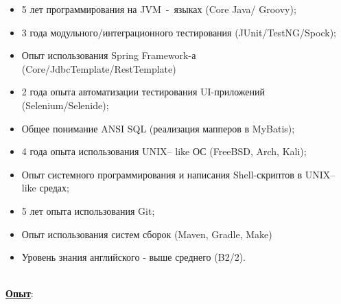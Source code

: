 \documentclass[hidelinks,12pt,a4paper,oneside]{article}
\newcommand*\tqs{\textquotesingle}
\begin{document}
{\normalsize
\begin{itemize}[noitemsep]
	\item 5 лет программирования на JVM\ -\ языках (Core \tqs Java\tqs /  \tqs Groovy\tqs);
	\item 3 года модульного/интеграционного тестирования (\tqs JUnit\tqs/\tqs TestNG\tqs/\tqs Spock\tqs);
	\item Опыт использования Spring Framework-а (Core/JdbcTemplate/RestTemplate)
	\item 2 года опыта автоматизации тестирования UI-приложений (\tqs Selenium\tqs/\tqs Selenide\tqs);
	\item Общее понимание ANSI SQL (реализация мапперов в \tqs MyBatis\tqs);
	\item 4 года опыта использования \tqs UNIX\tqs -- like ОС (\tqs FreeBSD\tqs, \tqs Arch\tqs, \tqs Kali\tqs);
	\item Опыт системного программирования и написания Shell-скриптов в \tqs UNIX\tqs -- like средах;
	\item 5 лет опыта использования \tqs Git\tqs;
	\item Опыт использования систем сборок (\tqs Maven\tqs, \tqs Gradle\tqs, \tqs Make\tqs)
	\item Уровень знания английского - выше среднего (B2/2).
\end{itemize}}
\vspace{-15px}
\ \\
{\Large \underline{\textbf{Опыт}}}:
\end{document}
